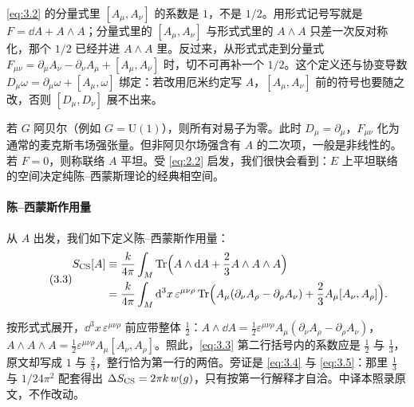 \begin{yizhu}[易错点]
\eqref{eq:3.2} 的分量式里 $[A_\mu,A_\nu]$ 的系数是 $1$，不是 $1/2$。用形式记号写就是 $F=\dd A+A\wedge A$；分量式里的 $[A_\mu,A_\nu]$ 与形式式里的 $A\wedge A$ 只差一次反对称化，那个 $1/2$ 已经并进 $A\wedge A$ 里。反过来，从形式式走到分量式 $F_{\mu\nu}=\partial_\mu A_\nu-\partial_\nu A_\mu+[A_\mu,A_\nu]$ 时，切不可再补一个 $1/2$。这个定义还与协变导数 $D_\mu\omega=\partial_\mu\omega+[A_\mu,\omega]$ 绑定：若改用厄米约定写 $A$，$[A_\mu,A_\nu]$ 前的符号也要随之改，否则 $[D_\mu,D_\nu]$ 展不出来。
\end{yizhu}

若 $G$ 阿贝尔（例如 $G=\mathrm{U}(1)$），则所有对易子为零。此时 $D_\mu=\partial_\mu$，$F_{\mu\nu}$ 化为通常的麦克斯韦场强张量。但非阿贝尔场强含有 $A$ 的二次项，一般是非线性的。若 $F=0$，则称联络 $A$ 平坦。受 \eqref{eq:2.2} 启发，我们很快会看到：$E$ 上平坦联络的空间决定纯陈--西蒙斯理论的经典相空间。

\paragraph{陈--西蒙斯作用量}
从 $A$ 出发，我们如下定义陈--西蒙斯作用量：
\begin{equation}\tag{3.3}\label{eq:3.3}
\begin{aligned}
  S_{\mathrm{CS}}[A] &\equiv \frac{k}{4\pi}\int_M \operatorname{Tr}\Bigl(A\wedge\mathrm{d} A + \frac{2}{3}A\wedge A\wedge A\Bigr)\\
  &= \frac{k}{4\pi}\int_M \mathrm{d}^3x\,\varepsilon^{\mu\nu\rho}\operatorname{Tr}\Bigl(A_\mu(\partial_\nu A_\rho - \partial_\rho A_\nu) + \frac{2}{3}A_\mu[A_\nu,A_\rho]\Bigr).
\end{aligned}
\end{equation}

\begin{yizhu}[原文疑误]
按形式式展开，$\dd^3x\,\varepsilon^{\mu\nu\rho}$ 前应带整体 $\frac12$：$A\wedge\dd A=\frac12\varepsilon^{\mu\nu\rho}A_\mu(\partial_\nu A_\rho-\partial_\rho A_\nu)$，$A\wedge A\wedge A=\frac12\varepsilon^{\mu\nu\rho}A_\mu[A_\nu,A_\rho]$。照此，\eqref{eq:3.3} 第二行括号内的系数应是 $\frac12$ 与 $\frac13$，原文却写成 $1$ 与 $\frac23$，整行恰为第一行的两倍。旁证是 \eqref{eq:3.4} 与 \eqref{eq:3.5}：那里 $\frac13$ 与 $1/24\pi^2$ 配套得出 $\Delta S_{\mathrm{CS}}=2\pi k\,w(g)$，只有按第一行解释才自洽。中译本照录原文，不作改动。
\end{yizhu}

